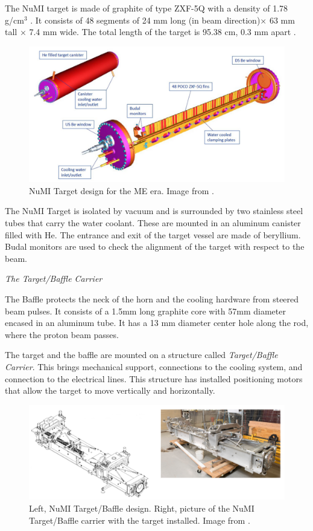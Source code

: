 The NuMI target is made of graphite of type ZXF-5Q with a density of 1.78 g/cm$^3$ \cite{Numi}. It consists of 48 segments of 24 mm long (in beam direction)$\times$ 63 mm tall $\times$ 7.4 mm wide. The total length of the target is 95.38 cm, 0.3 mm apart \cite{BenThesis}.

\begin{figure}[!htb]
\centering
\includegraphics[scale=0.33]{Figures/Chapter2/NuMITarget.png}
        \caption{NuMI Target design for the ME era. Image from \cite{NuMITarget}.} 
\label{fig:MnvExp:NuMI:NuMITarget}
\end{figure}

The NuMI Target is isolated by vacuum and is surrounded by two stainless steel tubes that carry the water coolant. These are mounted in an aluminum canister filled with He. The entrance and exit of the target vessel are made of beryllium. Budal monitors \cite{Budal} are used to check the alignment of the target with respect to the beam. 

\textit{The Target/Baffle Carrier}

The Baffle \cite{NOvATDR} protects the neck of the horn and the cooling hardware from steered beam pulses. It consists of a 1.5mm long graphite core with 57mm diameter encased in an aluminum tube. It has a 13 mm diameter center hole along the rod, where the proton beam passes. 

The target and the baffle are mounted on a structure called \textit{Target/Baffle Carrier}. This brings mechanical support, connections to the cooling system, and connection to the electrical lines. This structure has installed positioning motors that allow the target to move vertically and horizontally. 

 \begin{figure}[!htb]
\centering
\includegraphics[scale=0.33]{Figures/Chapter2/TargetCarrier.png}
        \caption{Left, NuMI Target/Baffle design. Right, picture of the NuMI Target/Baffle carrier with the target installed. Image from \cite{NuMITarget}.} 
\label{fig:MnvExp:NuMI:NuMITargetCarrier}
\end{figure}

